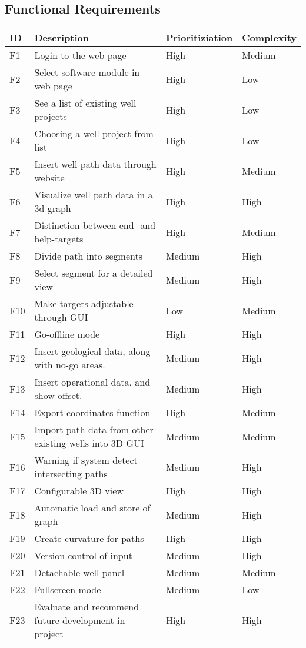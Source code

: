 \documentclass{report}
\begin{document}
\subsection{Functional Requirements} \label{subsec:functional_requirements}
\begin{tabular}{| l | p{5.9cm} | l | l |} \hline
ID & Description & Prioritiziation & Complexity \\ \hline
F1 & Login to the web page& High & Medium \\ \hline
F2 & Select software module in web page& High & Low \\ \hline
F3 & See a list of existing well projects & High & Low \\ \hline
F4 & Choosing a well project from list & High & Low \\ \hline
F5 & Insert well path data through website & High & Medium \\ \hline
F6 & Visualize well path data in a 3d graph & High & High \\ \hline
F7 & Distinction between end- and help-targets & High & Medium \\ \hline
F8 & Divide path into segments & Medium & High \\ \hline
F9 & Select segment for a detailed view & Medium & High\\ \hline
F10 & Make targets adjustable through GUI & Low & Medium\\ \hline
F11 & Go-offline mode & High & High\\ \hline
F12 & Insert geological data, along with no-go areas. & Medium & High \\ \hline
F13 & Insert operational data, and show offset. & Medium & High\\ \hline
F14 & Export coordinates function & High & Medium\\ \hline
F15 & Import path data from other existing wells into 3D GUI & Medium & Medium\\ \hline
F16 & Warning if system detect intersecting paths & Medium & High\\ \hline
F17 & Configurable 3D view & High & High\\ \hline
F18 & Automatic load and store of graph & Medium & High\\ \hline
F19 & Create curvature for paths & High & High \\ \hline
F20 & Version control of input & Medium & High\\ \hline
F21 & Detachable well panel & Medium & Medium\\ \hline
F22 & Fullscreen mode & Medium & Low\\ \hline
F23 & Evaluate and recommend future development in project & High & High\\ \hline
\end{tabular}
\end{document}

